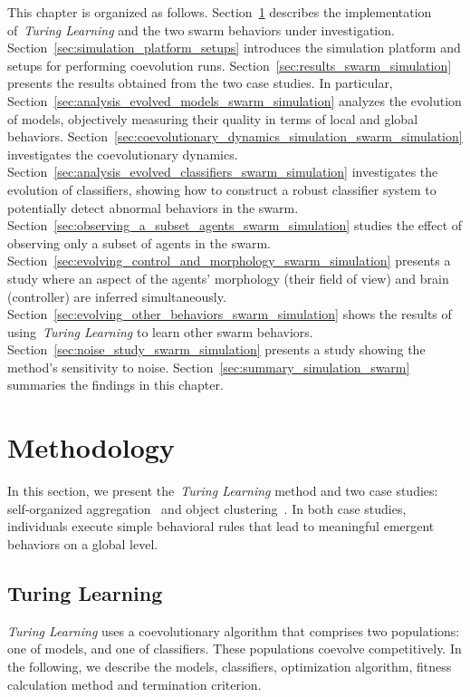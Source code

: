 This chapter is organized as follows. Section~\ref{sec:methodology_swarm_simulation} describes the implementation of~\textit{Turing Learning} and the two swarm behaviors under investigation. Section~\ref{sec:simulation_platform_setups} introduces the simulation platform and setups for performing coevolution runs. Section~\ref{sec:results_swarm_simulation} presents the results obtained from the two case studies. In particular, Section~\ref{sec:analysis_evolved_models_swarm_simulation} analyzes the evolution of models, objectively measuring their quality in terms of local and global behaviors. Section~\ref{sec:coevolutionary_dynamics_simulation_swarm_simulation} investigates the coevolutionary dynamics. Section~\ref{sec:analysis_evolved_classifiers_swarm_simulation} investigates the evolution of classifiers, showing how to construct a robust classifier system to potentially detect abnormal behaviors in the swarm. Section~\ref{sec:observing_a_subset_agents_swarm_simulation} studies the effect of observing only a subset of agents in the swarm. Section~\ref{sec:evolving_control_and_morphology_swarm_simulation} presents a study where an aspect of the agents' morphology (their field of view) and brain (controller) are inferred simultaneously. Section~\ref{sec:evolving_other_behaviors_swarm_simulation} shows the results of using~\textit{Turing Learning} to learn other swarm behaviors. Section~\ref{sec:noise_study_swarm_simulation} presents a study showing the method's sensitivity to noise. Section~\ref{sec:summary_simulation_swarm} summaries the findings in this chapter.


\section{Methodology}\label{sec:methodology_swarm_simulation}

In this section, we present the~\textit{Turing Learning} method and two case studies: self-organized aggregation~\cite{Gauci2014_ijrr} and object clustering~\cite{Melvin2014_aamas}. In both case studies, individuals execute simple behavioral rules that lead to meaningful emergent behaviors on a global level. 

\subsection{Turing Learning}\label{sec:turing_learning_swarm_simulation}

\textit{Turing Learning} uses a coevolutionary algorithm that comprises two populations: one of models, and one of classifiers. These populations coevolve competitively. In the following, we describe the models, classifiers, optimization algorithm, fitness calculation method and termination criterion. 

